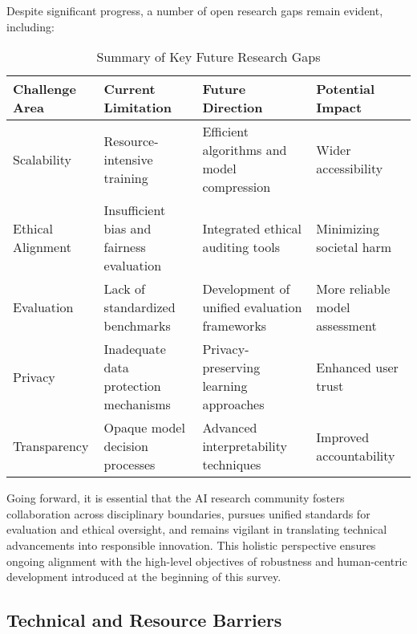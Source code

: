\documentclass[sigconf]{acmart}
\begin{document}
Despite significant progress, a number of open research gaps remain evident, including:

\begin{table*}[htbp]
\centering
\caption{Summary of Key Future Research Gaps}
\label{tab:future_gaps}
\begin{adjustbox}{max width=\textwidth}
\begin{tabular}{@{}llll@{}}
\toprule
Challenge Area & Current Limitation & Future Direction & Potential Impact \\
\midrule
Scalability & Resource-intensive training & Efficient algorithms and model compression & Wider accessibility\\
Ethical Alignment & Insufficient bias and fairness evaluation & Integrated ethical auditing tools & Minimizing societal harm\\
Evaluation & Lack of standardized benchmarks & Development of unified evaluation frameworks & More reliable model assessment\\
Privacy & Inadequate data protection mechanisms & Privacy-preserving learning approaches & Enhanced user trust\\
Transparency & Opaque model decision processes & Advanced interpretability techniques & Improved accountability\\
\bottomrule
\end{tabular}
\end{adjustbox}
\end{table*}

Going forward, it is essential that the AI research community fosters collaboration across disciplinary boundaries, pursues unified standards for evaluation and ethical oversight, and remains vigilant in translating technical advancements into responsible innovation. This holistic perspective ensures ongoing alignment with the high-level objectives of robustness and human-centric development introduced at the beginning of this survey.

\subsection{Technical and Resource Barriers}
\end{document}
